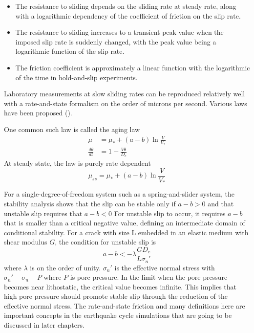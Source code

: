 \begin{itemize}
    \item The resistance to sliding depends on the sliding rate at steady rate, along with a logarithmic dependency of the coefficient of friction on the slip rate.
    \item The resistance to sliding increases to a transient peak value when the imposed slip rate is suddenly changed, with the peak value being a logarithmic function of the slip rate.
    \item The friction coefficient is approximately a linear function with the logarithmic of the time in hold-and-slip experiments.
\end{itemize}

Laboratory measurements at slow sliding rates can be reproduced relatively well with a rate-and-state formalism on the order of microns per second.
Various laws have been proposed (\cite{https://doi.org/10.1029/JB084iB05p02161, https://doi.org/10.1029/JB084iB05p02169,https://doi.org/10.1029/JB088iB12p10359,annurev:/content/journals/10.1146/annurev.earth.26.1.643}).

One common such law is called the aging law
\begin{align}
    \mu &= \mu_* + (a - b) \ln \frac{V}{V_*} \\
    \frac{d\theta}{dt} &= 1 - \frac{V\theta}{D_c}
\end{align}
At steady state, the law is purely rate dependent
\begin{equation}
    \mu_{ss} = \mu_{*} + (a - b) \ln \frac{V}{V_*}
\end{equation}

For a single-degree-of-freedom system such as a spring-and-slider system, the stability analysis shows that the slip can be stable only if $a - b > 0$ and that unstable slip requires that $a - b < 0$  
For unstable slip to occur, it requires $a - b$ that is smaller than a critical negative value, defining an intermediate domain of conditional stability.
For a crack with size L embedded in an elastic medium with shear modulus $G$, the condition for unstable slip is 
\begin{equation}
    a - b < - \lambda \frac{GD_c}{L\sigma_n'}
\end{equation}
where $\lambda$ is on the order of unity. 
$\sigma_n'$ is the effective normal stress with $\sigma_n' - \sigma_n - P$ where $P$ is pore pressure.
In the limit when the pore pressure becomes near lithostatic, the critical value becomes infinite.
This implies that high pore pressure should promote stable slip through the reduction of the effective normal stress.
The rate-and-state friction and many definitions here are important concepts in the earthquake cycle simulations that are going to be discussed in later chapters.

\cite{}